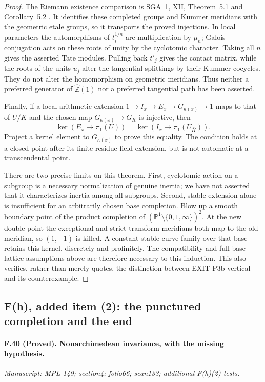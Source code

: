 \begin{proof}
The Riemann existence comparison is SGA~1, XII, Theorem~5.1 and
Corollary~5.2 \cite{SGA1}. It identifies these completed groups and
Kummer meridians with the geometric etale groups, so it transports
the proved injections. In local parameters the automorphisms of
$t_i^{1/n}$ are multiplication by $\mu_n$; Galois conjugation acts on
these roots of unity by the cyclotomic character. Taking all $n$
gives the asserted Tate modules. Pulling back $t'_j$ gives the contact
matrix, while the roots of the units $u_j$ alter the tangential
splittings by their Kummer cocycles. They do not alter the homomorphism
on geometric meridians. Thus neither a preferred generator of
$\widehat{\mathbb Z}(1)$ nor a preferred tangential path has been
asserted.

Finally, if a local arithmetic extension
$1\to I_x\to E_x\to G_{\kappa(x)}\to1$ maps to that of $U/K$ and the
chosen map $G_{\kappa(x)}\to G_K$ is injective, then
\[
 \ker(E_x\to\pi_1(U))=
 \ker(I_x\to\pi_1(U_{\bar K})).
\]
Project a kernel element to $G_{\kappa(x)}$ to prove this equality.
The condition holds at a closed point after its finite residue-field
extension, but is not automatic at a transcendental point.

There are two precise limits on this theorem. First, cyclotomic action
on a subgroup is a necessary normalization of genuine inertia; we have
not asserted that it characterizes inertia among all subgroups.
Second, stable extension alone is insufficient for an arbitrarily
chosen base completion. Blow up a smooth boundary point of the product
completion of $(\mathbb P^1\setminus\{0,1,\infty\})^2$. At the new
double point the exceptional and strict-transform meridians both map
to the old meridian, so $(1,-1)$ is killed. A constant stable curve
family over that base retains this kernel, discretely and profinitely.
The compatibility and full base-lattice assumptions above are therefore
necessary to this induction. This also verifies, rather than merely
quotes, the distinction between EXIT P3b-vertical and its counterexample.
\end{proof}

\subsection{F(h), added item (2): the punctured completion and the end}

\paragraph{F.40 (Proved). Nonarchimedean invariance, with the missing hypothesis.}
\textit{Manuscript: MPL 149; section4; folio66; scan133; additional F(h)(2) tests.}

